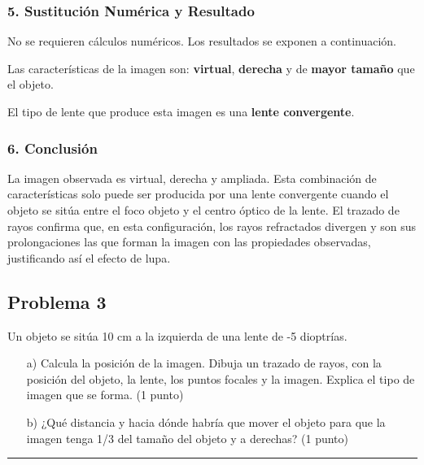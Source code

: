 \subsubsection*{5. Sustitución Numérica y Resultado}
No se requieren cálculos numéricos. Los resultados se exponen a continuación.
\begin{cajaresultado}
    Las características de la imagen son: \textbf{virtual}, \textbf{derecha} y de \textbf{mayor tamaño} que el objeto.
\end{cajaresultado}
\begin{cajaresultado}
    El tipo de lente que produce esta imagen es una \textbf{lente convergente}.
\end{cajaresultado}

\subsubsection*{6. Conclusión}
\begin{cajaconclusion}
La imagen observada es virtual, derecha y ampliada. Esta combinación de características solo puede ser producida por una lente convergente cuando el objeto se sitúa entre el foco objeto y el centro óptico de la lente. El trazado de rayos confirma que, en esta configuración, los rayos refractados divergen y son sus prolongaciones las que forman la imagen con las propiedades observadas, justificando así el efecto de lupa.
\end{cajaconclusion}

\newpage
\subsection{Problema 3}
\label{subsec:P3_2021_jun_ord}

\begin{cajaenunciado}
Un objeto se sitúa 10 cm a la izquierda de una lente de -5 dioptrías.
\begin{enumerate}
    \item[a)] Calcula la posición de la imagen. Dibuja un trazado de rayos, con la posición del objeto, la lente, los puntos focales y la imagen. Explica el tipo de imagen que se forma. (1 punto)
    \item[b)] ¿Qué distancia y hacia dónde habría que mover el objeto para que la imagen tenga 1/3 del tamaño del objeto y a derechas? (1 punto)
\end{enumerate}
\end{cajaenunciado}
\hrule

